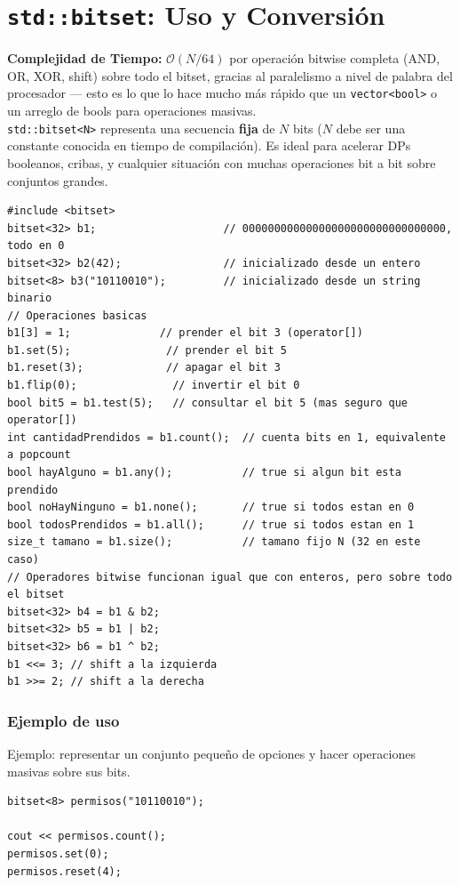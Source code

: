 \documentclass[10pt,twocolumn,letterpaper]{report}
\begin{document}
\section{\texttt{std::bitset}: Uso y Conversión}
\textbf{Complejidad de Tiempo:} $\mathcal{O}(N/64)$ por operación bitwise completa (AND, OR, XOR, shift) sobre todo el bitset, gracias al paralelismo a nivel de palabra del procesador — esto es lo que lo hace mucho más rápido que un \texttt{vector<bool>} o un arreglo de bools para operaciones masivas. \\
\texttt{std::bitset<N>} representa una secuencia \textbf{fija} de $N$ bits ($N$ debe ser una constante conocida en tiempo de compilación). Es ideal para acelerar DPs booleanos, cribas, y cualquier situación con muchas operaciones bit a bit sobre conjuntos grandes.
\begin{lstlisting}
#include <bitset>
bitset<32> b1;                    // 00000000000000000000000000000000, todo en 0
bitset<32> b2(42);                // inicializado desde un entero
bitset<8> b3("10110010");         // inicializado desde un string binario
// Operaciones basicas
b1[3] = 1;              // prender el bit 3 (operator[])
b1.set(5);               // prender el bit 5
b1.reset(3);             // apagar el bit 3
b1.flip(0);               // invertir el bit 0
bool bit5 = b1.test(5);   // consultar el bit 5 (mas seguro que operator[])
int cantidadPrendidos = b1.count();  // cuenta bits en 1, equivalente a popcount
bool hayAlguno = b1.any();           // true si algun bit esta prendido
bool noHayNinguno = b1.none();       // true si todos estan en 0
bool todosPrendidos = b1.all();      // true si todos estan en 1
size_t tamano = b1.size();           // tamano fijo N (32 en este caso)
// Operadores bitwise funcionan igual que con enteros, pero sobre todo el bitset
bitset<32> b4 = b1 & b2;
bitset<32> b5 = b1 | b2;
bitset<32> b6 = b1 ^ b2;
b1 <<= 3; // shift a la izquierda
b1 >>= 2; // shift a la derecha
\end{lstlisting}
\subsubsection*{Ejemplo de uso}
Ejemplo: representar un conjunto pequeño de opciones y hacer operaciones masivas sobre sus bits.
\begin{lstlisting}
bitset<8> permisos("10110010");

cout << permisos.count();
permisos.set(0);
permisos.reset(4);
\end{lstlisting}
\end{document}
